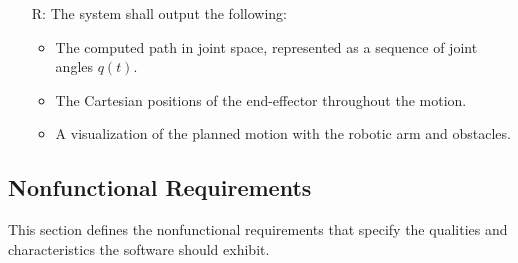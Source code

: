 \documentclass[12pt]{article}
\newcounter{reqnum} %
\begin{document}
\begin{itemize}
  \item[R\refstepcounter{reqnum}\thereqnum \label{R_Output}:]  
    The system shall output the following:
    \begin{itemize}
      \item The computed path in joint space, represented as a sequence of joint angles \( q(t) \).
      \item The Cartesian positions of the end-effector throughout the motion.
      \item A visualization of the planned motion with the robotic arm and obstacles.
    \end{itemize}
  
  \end{itemize}
  
  \subsection{Nonfunctional Requirements}

  This section defines the nonfunctional requirements that specify the qualities and characteristics the software should exhibit.
  
\end{document}
